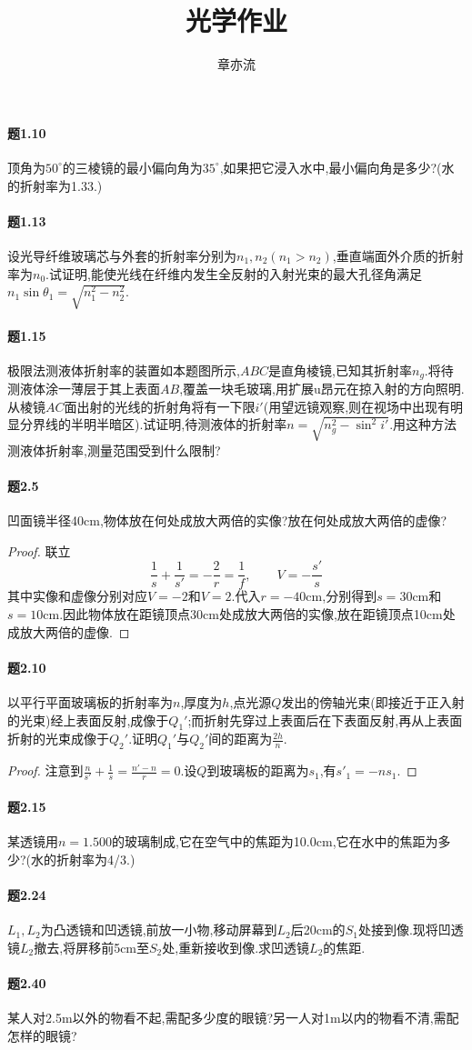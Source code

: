\documentclass{article}
\title{光学作业}
\author{章亦流}
\newcommand{\cm}{\mathrm{cm}}
\begin{document}
\maketitle
\paragraph{题1.10}顶角为$50^\circ$的三棱镜的最小偏向角为$35^\circ$,如果把它浸入水中,最小偏向角是多少?(水的折射率为1.33.)

\paragraph{题1.13}设光导纤维玻璃芯与外套的折射率分别为$n_1,n_2(n_1>n_2)$,垂直端面外介质的折射率为$n_0$.试证明,能使光线在纤维内发生全反射的入射光束的最大孔径角满足$n_1\sin\theta_1=\sqrt{n_1^2-n_2^2}$.

\paragraph{题1.15}极限法测液体折射率的装置如本题图所示,$ABC$是直角棱镜,已知其折射率$n_g$.将待测液体涂一薄层于其上表面$AB$,覆盖一块毛玻璃,用扩展u昂元在掠入射的方向照明.从棱镜$AC$面出射的光线的折射角将有一下限$i'$(用望远镜观察,则在视场中出现有明显分界线的半明半暗区).试证明,待测液体的折射率$n=\sqrt{n_g^2-\sin^2 i'}$.用这种方法测液体折射率,测量范围受到什么限制?

\paragraph{题2.5}凹面镜半径40cm,物体放在何处成放大两倍的实像?放在何处成放大两倍的虚像?
\begin{proof}
    联立$$\frac{1}{s}+\frac{1}{s'}=-\frac{2}{r}=\frac{1}{f},\qquad V=-\frac{s'}{s}$$
    其中实像和虚像分别对应$V=-2$和$V=2$.代入$r=-40\cm$,分别得到$s=30\cm$和$s=10\cm$.因此物体放在距镜顶点30cm处成放大两倍的实像,放在距镜顶点10cm处成放大两倍的虚像.
\end{proof}

\paragraph{题2.10}以平行平面玻璃板的折射率为$n$,厚度为$h$,点光源$Q$发出的傍轴光束(即接近于正入射的光束)经上表面反射,成像于$Q_1'$;而折射先穿过上表面后在下表面反射,再从上表面折射的光束成像于$Q_2'$.证明$Q_1'$与$Q_2'$间的距离为$\frac{2h}{n}$.
\begin{proof}
    注意到$\frac{n}{s'}+\frac{1}{s}=\frac{n'-n}{r}=0$.设$Q$到玻璃板的距离为$s_1$,有$s'_1=-ns_1$.
\end{proof}

\paragraph{题2.15}某透镜用$n=1.500$的玻璃制成,它在空气中的焦距为10.0cm,它在水中的焦距为多少?(水的折射率为4/3.)

\paragraph{题2.24}$L_1,L_2$为凸透镜和凹透镜,前放一小物,移动屏幕到$L_2$后20cm的$S_1$处接到像.现将凹透镜$L_2$撤去,将屏移前5cm至$S_2$处,重新接收到像.求凹透镜$L_2$的焦距.

\paragraph{题2.40}某人对2.5m以外的物看不起,需配多少度的眼镜?另一人对1m以内的物看不清,需配怎样的眼镜?
\end{document}

